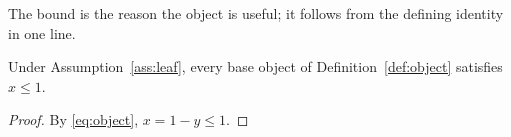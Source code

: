 
The bound is the reason the object is useful; it follows from the defining
identity in one line.

\begin{theorem}\label{thm:bound}
Under Assumption~\ref{ass:leaf}, every base object of
Definition~\ref{def:object} satisfies $x \le 1$.
\end{theorem}

\begin{proof}
By \eqref{eq:object}, $x = 1 - y \le 1$.
\end{proof}
